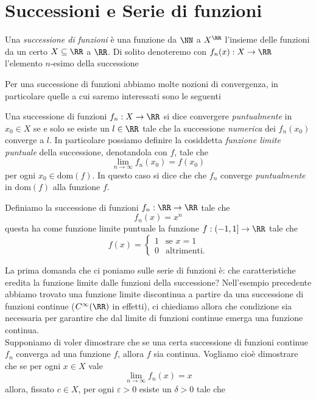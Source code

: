 \documentclass[11pt]{scrartcl}
\begin{document}
	\section{Successioni e Serie di funzioni}
	\begin{definition}
		Una \textit{successione di funzioni} è una funzione da $\NN$ a $X^\RR$ l'insieme delle funzioni da un certo $X\subseteq \RR$ a $\RR$. Di solito denoteremo con $f_n(x):X\to\RR$ l'elemento $n$-esimo della successione 
	\end{definition}
	Per una successione di funzioni abbiamo molte nozioni di convergenza, in particolare quelle a cui saremo interessati sono le seguenti
	\begin{definition}
		Una successione di funzioni $f_n:X\to\RR$ si dice convergere \textit{puntualmente} in $x_0\in X$ se e solo se esiste un $l\in \RR$ tale che la successione \textit{numerica} dei $f_n(x_0)$ converge a $l$. In particolare possiamo definire la cosiddetta \textit{funzione limite puntuale} della successione, denotandola con $f$, tale che
		$$\lim_{n\to\infty}f_n(x_0)=f(x_0)$$
		per ogni $x_0\in \text{dom}(f)$. In questo caso si dice che che $f_n$ converge \textit{puntualmente} in $\text{dom}(f)$ alla funzione $f$.
	\end{definition}
	\begin{example}[Potenze]
		Definiamo la successione di funzioni $f_n:\RR\to\RR$ tale che
		$$f_n(x)=x^n$$
		questa ha come funzione limite puntuale la funzione $f:(-1,1]\to\RR$ tale che
		$$f(x)=
		\begin{cases}
			1 & \text{se $x=1$} \\
			0 & \text{altrimenti.}
		\end{cases}
		$$
	\end{example}
	La prima domanda che ci poniamo sulle serie di funzioni è: che caratteristiche eredita la funzione limite dalle funzioni della successione? Nell'esempio precedente abbiamo trovato una funzione limite discontinua a partire da una successione di funzioni continue ($C^\infty(\RR)$ in effetti), ci chiediamo allora che condizione sia necessaria per garantire che dal limite di funzioni continue emerga una funzione continua. \\
	Supponiamo di voler dimostrare che se una certa successione di funzioni continue $f_n$ converga ad una funzione $f$, allora $f$ sia continua. Vogliamo cioè dimostrare che se per ogni $x\in X$ vale
	$$\lim_{n\to\infty}f_n(x)=x$$
	allora, fissato $c\in X$, per ogni $\varepsilon>0$ esiste un $\delta>0$ tale che 
\end{document}

